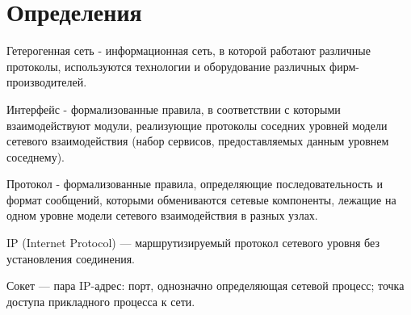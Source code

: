 \chapter*{Определения}
Гетерогенная сеть - информационная сеть, в которой работают различные протоколы, используются технологии и оборудование различных фирм-производителей.

Интерфейс - формализованные правила, в соответствии с которыми взаимодействуют модули, реализующие протоколы соседних уровней модели сетевого взаимодействия (набор сервисов, предоставляемых данным уровнем соседнему).

Протокол - формализованные правила, определяющие последовательность и формат сообщений, которыми обмениваются сетевые компоненты, лежащие на одном уровне модели сетевого взаимодействия в разных узлах.

IP (Internet Protocol) — маршрутизируемый протокол сетевого уровня без установления соединения.

Сокет — пара IP-адрес: порт, однозначно определяющая сетевой процесс; точка доступа прикладного процесса к сети.